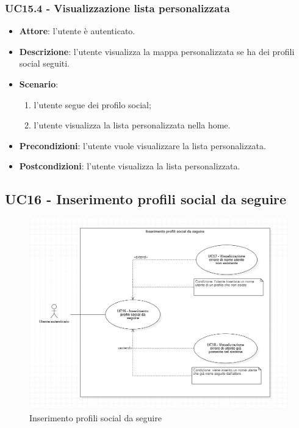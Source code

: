 \subsubsection{UC15.4 - Visualizzazione lista personalizzata}
\begin{itemize}
    \item \textbf{Attore}: l'utente è autenticato.
    \item \textbf{Descrizione}: l'utente visualizza la mappa personalizzata se ha dei profili social seguiti.
    \item \textbf{Scenario}:
    \begin{enumerate}
        \item l'utente segue dei profilo social;
        \item l'utente visualizza la lista personalizzata nella home.
    \end{enumerate}

    \item \textbf{Precondizioni}: l'utente vuole visualizzare la lista personalizzata.
    \item \textbf{Postcondizioni}: l'utente visualizza la lista personalizzata.
\end{itemize}

\subsection{UC16 - Inserimento profili social da seguire}
\begin{figure}[H]
    \includegraphics[width=15cm]{sezioni/Images/UC16.png}
    \centering
    \caption{Inserimento profili social da seguire}
\end{figure}


